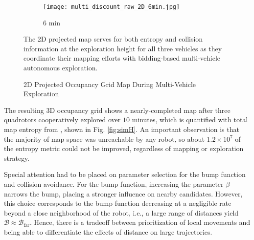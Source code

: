 \begin{figure}[!t]
{    	\begin{subfigure}[t]{0.25\columnwidth}
          	\texttt{[image: multi\_discount\_raw\_2D\_6min.jpg]}
        		\caption{$6$ min}
    	\end{subfigure}
	}
	\caption{2D Projected Occupancy Grid Map During Multi-Vehicle Exploration}
	\medskip
	\small
	The 2D projected map serves for both entropy and collision information at the exploration height for all three vehicles as they coordinate their mapping efforts with bidding-based multi-vehicle autonomous exploration.
	\label{fig:sim2Dmaps}
\end{figure}

	
	
The resulting 3D occupancy grid shows a nearly-completed map after three quadrotors cooperatively explored over $10$ minutes, which is quantified with total map entropy from , shown in Fig. \ref{fig:simH}. An important observation is that the majority of map space was unreachable by any robot, so about $1.2\times10^7$ of the entropy metric could not be improved, regardless of mapping or exploration strategy.

Special attention had to be placed on parameter selection for the bump function and collision-avoidance. For the bump function, increasing the parameter $\beta$ narrows the bump, placing a stronger influence on nearby candidates. However, this choice corresponds to the bump function decreasing at a negligible rate beyond a close neighborhood of the robot, i.e., a large range of distances yield $\mathcal B\approx\mathcal B_\text{far}$. Hence, there is a tradeoff between prioritization of local movements and being able to differentiate the effects of distance on large trajectories.

